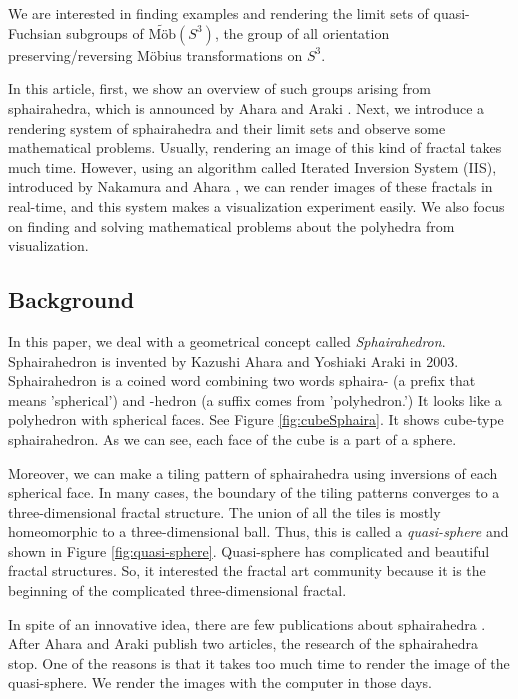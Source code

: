 \documentclass[suppldata, dvipdfmx]{interact}
\theoremstyle{plain}%
\theoremstyle{definition}
\theoremstyle{remark}
\theoremstyle{problemstyle}
\begin{document}
We are interested in finding examples and rendering the limit sets of
quasi-Fuchsian subgroups of $\tilde{\text{M\"ob}}(S^3)$, the group of all
orientation preserving/reversing M\"obius transformations on $S^3$. 

In this article, first, we show an overview of such groups arising from
sphairahedra, which is announced by Ahara and Araki \cite{AharaAraki}.
Next, we introduce a rendering system of sphairahedra and their limit
sets and observe some mathematical problems. 
Usually, rendering an image of this kind of fractal takes much time.
However, using an algorithm called Iterated Inversion System (IIS),
introduced by Nakamura and Ahara \cite{bridges2016}\cite{bridges2017},
we can render images of these fractals in real-time, and this system
makes a visualization experiment easily. We also focus on finding and
solving mathematical problems about the polyhedra from visualization.

\subsection{Background}

In this paper, we deal with a geometrical concept called
\textit{Sphairahedron}. Sphairahedron is invented by Kazushi Ahara and
Yoshiaki Araki \cite{AharaAraki} in 2003. Sphairahedron is a coined word
combining two words sphaira- (a prefix that means 'spherical') and
 -hedron (a suffix comes from 'polyhedron.') It looks like a polyhedron
with spherical faces. See Figure \ref{fig:cubeSphaira}. It shows cube-type
sphairahedron. As we can see, each face of the cube is a part of a
sphere.

Moreover, we can make a tiling pattern of sphairahedra using inversions
of each spherical face. In many cases, the boundary of the tiling
patterns converges to a three-dimensional fractal structure. 
The union of all the tiles is mostly homeomorphic to a three-dimensional
ball. Thus, this is called a \textit{quasi-sphere} and shown in Figure
\ref{fig:quasi-sphere}.
Quasi-sphere has complicated and beautiful fractal structures.
So, it interested the fractal art community because it is the beginning of
the complicated three-dimensional fractal.

In spite of an innovative idea, there are few publications about sphairahedra
\cite{AharaAraki}\cite{AharaJa}.
After Ahara and Araki publish two articles, the research of the
sphairahedra stop. 
One of the reasons is that it takes too much time to render the image of
the quasi-sphere.
We render the images with the computer in those days.
\end{document}
